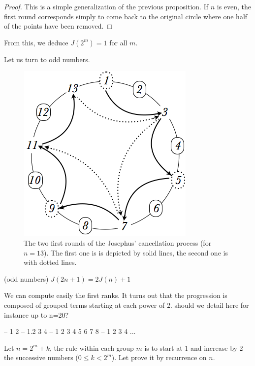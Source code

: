 {\begin{proof}
This is a simple generalization of the previous proposition.
If $n$ is even, the first round corresponds simply to come back to the original circle where one half of the points have been removed. 
\end{proof}

From this, we deduce $J(2^m)=1$ for all $m$.
\medskip

Let us turn to odd numbers.
\begin{figure}[h]
\begin{center}
        \includegraphics[scale=0.4]{FiguresMaths/josephus13}
        \caption{The two first rounds of the Josephus' cancellation process (for $n=13$).
        The first one is is depicted by solid lines, the second one is with dotted lines.}
        \label{fig:josephus13}
\end{center}
\end{figure}
\medskip

\begin{prop} (odd numbers)
$J(2n+1) = 2J(n)+1$ 
\end{prop}

We can compute easily the first ranks.
It turns out that the progression is composed of grouped terms starting at each power of $2$. 
{\Denis should we detail here for instance up to n=20?}

{ -- 1 2 -- 1.2 3 4 -- 1 2 3 4 5 6 7  8 -- 1  2  3 4 ...}

Let $n=2^m+k$, the rule within each group $m$ is to start at $1$ and increase by $2$ the successive numbers
($0 \leq k < 2^m$).
Let prove it by recurrence on $n$.
\medskip

}
